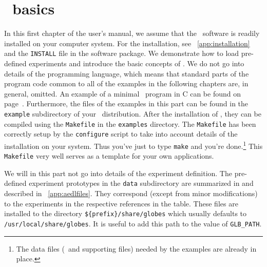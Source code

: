 \chapter{\GLOBES\ basics}
\label{chapt:gettingstarted}

In this first chapter of the user's manual, we assume that the \GLOBES\ 
software is readily installed on your computer system. For the installation,
see \App~\ref{app:installation} and the {\tt INSTALL} file in the
software package. We demonstrate how to load pre-defined experiments 
and introduce the basic concepts of \GLOBES . We do not go
into details of the programming language, which means that standard parts
of the program code common to all of the examples in the following chapters 
are, in general, omitted.
An example of a minimal \GLOBES\ program in C can be found on 
page~\pageref{ex:c}. Furthermore, the files of the examples in this part 
can be found in the \verb+example+ subdirectory of your \GLOBES\ distribution.
 \index{norm}{Examples} 
After the installation of \GLOBES, they can be compiled using 
the \verb+Makefile+ in the \verb+examples+
 directory. The  \verb+Makefile+ has been correctly setup by the 
\verb+configure+
script to take into account details of the installation on your system. Thus
you've just to type \verb+make+ and you're done.\footnote{The  
data files (\AEDL\ and supporting files) needed by the
examples are already in place.} This \verb+Makefile+ very well serves
as a template for your own applications.

We will in this part not go into details of the experiment
definition. The pre-defined experiment prototypes in the {\tt data}
subdirectory are summarized in \tabl{experiments} and described in
\App~\ref{app:aedlfiles}. They correspond
(except from minor modifications) to the experiments in the
respective references in the table. These files are installed to
the directory \verb+${prefix}/share/globes+ which usually defaults
to  \verb+/usr/local/share/globes+. It is useful to add this path
to the value of \verb+GLB_PATH+.


